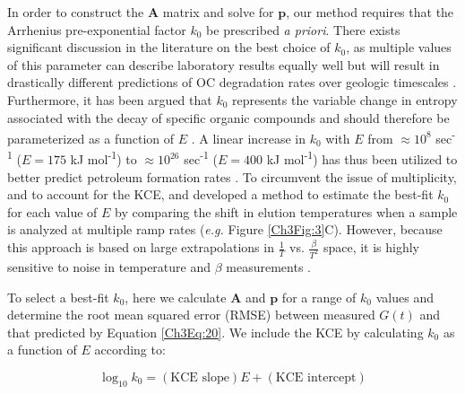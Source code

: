 In order to construct the $\mathbf{A}$ matrix and solve for $\mathbf{p}$, our method requires that the Arrhenius pre-exponential factor $k_{0}$ be prescribed \textit{a priori}. There exists significant discussion in the literature on the best choice of $k_{0}$, as multiple values of this parameter can describe laboratory results equally well but will result in drastically different predictions of OC degradation rates over geologic timescales \citep{Braun:1987vf,Burnham:1987ut,Lakshmanan:1991tr,Dieckmann:2005dw}. Furthermore, it has been argued that $k_{0}$ represents the variable change in entropy associated with the decay of specific organic compounds and should therefore be parameterized as a function of $E$ \citep[the so-called "kinetic compensation effect" or "KCE";][]{Tang:2000ua}. A linear increase in $k_{0}$ with $E$ from $\approx 10^{8}$ sec\textsuperscript{-1} ($E = 175$ kJ mol\textsuperscript{-1}) to $\approx 10^{26}$ sec\textsuperscript{-1} ($E = 400$ kJ mol\textsuperscript{-1}) has thus been utilized to better predict petroleum formation rates \citep{Dieckmann:2005dw}. To circumvent the issue of multiplicity, and to account for the KCE, \citet{Miura:1995uo} and \citet{Miura:1998jf} developed a method to estimate the best-fit $k_{0}$ for each value of $E$ by comparing the shift in elution temperatures when a sample is analyzed at multiple ramp rates (\textit{e.g.} Figure \ref{Ch3Fig:3}C). However, because this approach is based on large extrapolations in $\frac{1}{T}$ vs. $\frac{\beta}{T^{2}}$ space, it is highly sensitive to noise in temperature and $\beta$ measurements \citep{Burnham:1989vm}.

To select a best-fit $k_{0}$, here we calculate $\mathbf{A}$ and $\mathbf{p}$ for a range of $k_{0}$ values and determine the root mean squared error (RMSE) between measured $G(t)$ and that predicted by Equation \ref{Ch3Eq:20}. We include the KCE by calculating $k_{0}$ as a function of $E$ according to:

\begin{equation}\label{Ch3Eq:21}
	\log_{10} k_{0} = (\text{KCE slope})E + (\text{KCE intercept})
\end{equation}

